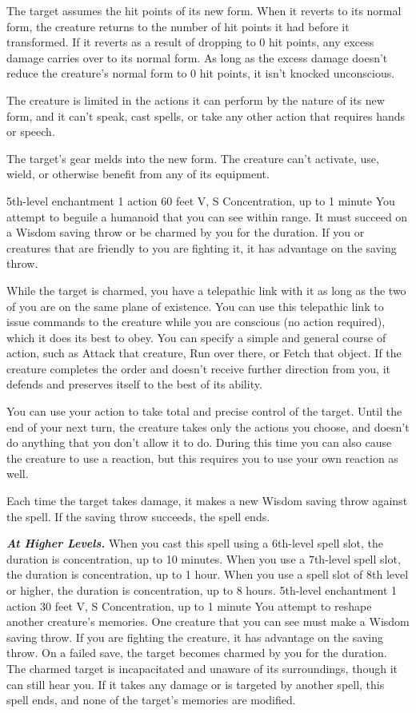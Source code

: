 \documentclass[10pt,twoside,twocolumn,openany]{book}
\newcommand\impact[1]{
	\textbf{\textit{#1}}
}
\begin{document}
The target assumes the hit points of its new form. When it reverts to its normal form, the creature returns to the number of hit points it had before it transformed. If it reverts as a result of dropping to 0 hit points, any excess damage carries over to its normal form. As long as the excess damage doesn't reduce the creature's normal form to 0 hit points, it isn't knocked unconscious.

The creature is limited in the actions it can perform by the nature of its new form, and it can't speak, cast spells, or take any other action that requires hands or speech.

The target's gear melds into the new form. The creature can't activate, use, wield, or otherwise benefit from any of its equipment.

{5th-level enchantment}
{\color{action} 1 action}
{60 feet}
{V, S}
{{\color{concentration}Concentration}, up to 1 minute}
%
You attempt to beguile a humanoid that you can see within range. It must succeed on a Wisdom saving throw or be charmed by you for the duration. If you or creatures that are friendly to you are fighting it, it has advantage on the saving throw.

While the target is charmed, you have a telepathic link with it as long as the two of you are on the same plane of existence. You can use this telepathic link to issue commands to the creature while you are conscious (no action required), which it does its best to obey. You can specify a simple and general course of action, such as Attack that creature, Run over there, or Fetch that object. If the creature completes the order and doesn't receive further direction from you, it defends and preserves itself to the best of its ability.

You can use your action to take total and precise control of the target. Until the end of your next turn, the creature takes only the actions you choose, and doesn't do anything that you don't allow it to do. During this time you can also cause the creature to use a reaction, but this requires you to use your own reaction as well.

Each time the target takes damage, it makes a new Wisdom saving throw against the spell. If the saving throw succeeds, the spell ends.

\impact{At Higher Levels.} When you cast this spell using a 6th-level spell slot, the duration is concentration, up to 10 minutes. When you use a 7th-level spell slot, the duration is concentration, up to 1 hour. When you use a spell slot of 8th level or higher, the duration is concentration, up to 8 hours.
\newpage
{}
{5th-level enchantment}
{\color{action} 1 action}
{30 feet}
{V, S}
{{\color{concentration}Concentration}, up to 1 minute}
%
You attempt to reshape another creature's memories. One creature that you can see must make a Wisdom saving throw. If you are fighting the creature, it has advantage on the saving throw. On a failed save, the target becomes charmed by you for the duration. The charmed target is incapacitated and unaware of its surroundings, though it can still hear you. If it takes any damage or is targeted by another spell, this spell ends, and none of the target's memories are modified.
\end{document}
